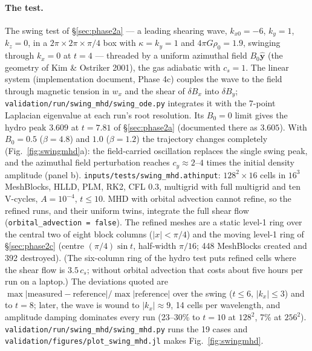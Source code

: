 \documentclass[11pt]{article}
\newcommand{\code}[1]{\texttt{#1}}
\newcommand{\file}[1]{\texttt{#1}}
\begin{document}
\paragraph{The test.} The swing test of \S\ref{sec:phase2a} --- a leading shearing wave,
$k_{x0} = -6$, $k_y = 1$, $k_z = 0$, in a $2\pi\times2\pi\times\pi/4$ box with
$\kappa = k_y = 1$ and $4\pi G\rho_0 = 1.9$, swinging through $k_x = 0$ at $t = 4$ --- threaded
by a uniform azimuthal field $B_0\hat{\mathbf y}$ (the geometry of Kim \& Ostriker 2001), the
gas adiabatic with $c_s = 1$. The linear system (implementation document, Phase 4c) couples
the wave to the field through magnetic tension in $w_x$ and the shear of $\delta B_x$ into
$\delta B_y$; \file{validation/run/swing\_mhd/swing\_ode.py} integrates it with the 7-point
Laplacian eigenvalue at each run's root resolution. Its $B_0 = 0$ limit gives the hydro peak
$3.609$ at $t = 7.81$ of \S\ref{sec:phase2a} (documented there as $3.605$). With $B_0 = 0.5$
($\beta = 4.8$) and $1.0$ ($\beta = 1.2$) the trajectory changes completely
(Fig.~\ref{fig:swingmhd}a): the field-carried oscillation replaces the single swing peak, and
the azimuthal field perturbation reaches $c_y \approx 2$--$4$ times the initial density
amplitude (panel b). \file{inputs/tests/swing\_mhd.athinput}: $128^2\times16$ cells in $16^3$
MeshBlocks, HLLD, PLM, RK2, CFL $0.3$, multigrid with full multigrid and ten V-cycles,
$A = 10^{-4}$, $t \le 10$. MHD with orbital advection cannot refine, so the refined runs, and
their uniform twins, integrate the full shear flow (\code{orbital\_advection = false}). The
refined meshes are a static level-1 ring over the central two of eight block columns
($|x| < \pi/4$) and the moving level-1 ring of \S\ref{sec:phase2c} (centre $(\pi/4)\sin t$,
half-width $\pi/16$; 448 MeshBlocks created and 392 destroyed). (The six-column ring of the
hydro test puts refined cells where the shear flow is $3.5\,c_s$; without orbital advection
that costs about five hours per run on a laptop.) The deviations quoted are
$\max|\text{measured} - \text{reference}|/\max|\text{reference}|$ over the swing ($t \le 6$,
$|k_x| \le 3$) and to $t = 8$; later, the wave is wound to $|k_x| \approx 9$, 14 cells per
wavelength, and amplitude damping dominates every run (23--30\% to $t = 10$ at $128^2$, 7\% at
$256^2$). \file{validation/run/swing\_mhd/swing\_mhd.py} runs the 19 cases and
\file{validation/figures/plot\_swing\_mhd.jl} makes Fig.~\ref{fig:swingmhd}.
\end{document}
